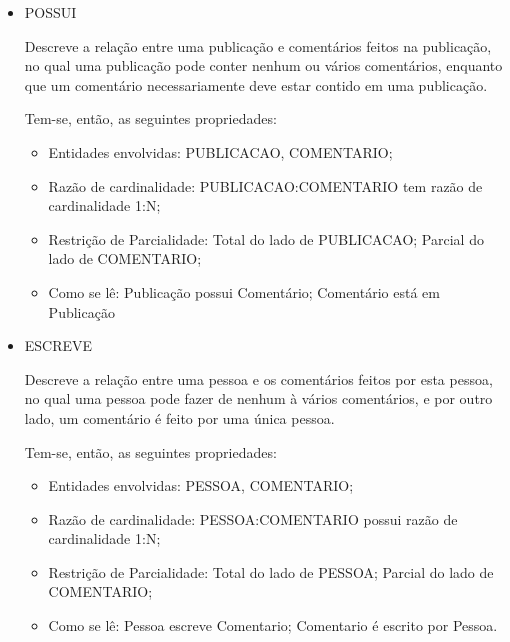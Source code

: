 \begin{itemize}
				\item POSSUI

Descreve a relação entre uma publicação e comentários feitos na publicação, no qual uma publicação pode conter nenhum ou vários comentários, enquanto que um comentário necessariamente deve estar contido em uma publicação.

Tem-se, então, as seguintes propriedades:
\begin{itemize}
				\item Entidades envolvidas: PUBLICACAO, COMENTARIO;
				\item Razão de cardinalidade: PUBLICACAO:COMENTARIO tem razão de cardinalidade 1:N;
				\item Restrição de Parcialidade: Total do lado de PUBLICACAO; Parcial do lado de COMENTARIO;
				\item Como se lê: Publicação possui Comentário; Comentário está em Publicação
\end{itemize}
\end{itemize}

\begin{itemize}
				\item ESCREVE

Descreve a relação entre uma pessoa e os comentários feitos por esta pessoa, no qual uma pessoa pode fazer de nenhum à vários comentários, e por outro lado, um comentário é feito por uma única pessoa.

Tem-se, então, as seguintes propriedades:
\begin{itemize}

\item Entidades envolvidas: PESSOA, COMENTARIO;
\item Razão de cardinalidade: PESSOA:COMENTARIO possui razão de cardinalidade 1:N;
\item Restrição de Parcialidade: Total do lado de PESSOA; Parcial do lado de COMENTARIO;
\item Como se lê: Pessoa escreve Comentario; Comentario é escrito por Pessoa.
\end{itemize}
\end{itemize}

